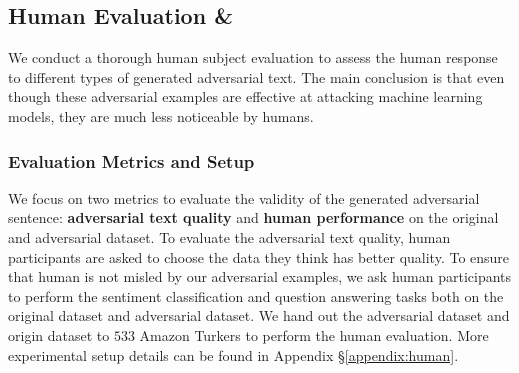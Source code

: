 \subsection{Human Evaluation \& \advcodecsent}
\label{sec:quality}
We conduct a thorough human subject evaluation to assess the human response to different types of generated adversarial text. The main conclusion is that even though these adversarial examples are effective at attacking machine learning models, they are much less noticeable by humans.

\subsubsection{Evaluation Metrics and Setup} We focus on two metrics to evaluate the validity of the generated adversarial sentence:
\textbf{adversarial text quality} and  \textbf{human performance} on the original and adversarial dataset. To evaluate the adversarial text quality, human participants are asked to choose the data they think has better quality. To ensure that human is not misled by our adversarial examples, we ask human participants to perform the sentiment classification and question answering tasks both on the original dataset and adversarial dataset. We hand out the adversarial dataset and origin dataset to $533$ Amazon Turkers to perform the human evaluation. More experimental setup details can be found in Appendix \S\ref{appendix:human}.





